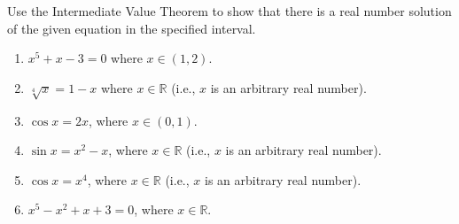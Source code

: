 Use the Intermediate Value Theorem to show that there is a real number solution of the given equation in the specified interval. 
\begin{multicols}{2}
\begin{enumerate}[ref={\fcProblemRef}]
\item $x^5+x-3=0$ where $x\in (1,2)$.
\item $\sqrt[4]{x}=1-x$ where $x\in \mathbb R$ (i.e., $x$ is an arbitrary real number).
\item $\cos x=2x$, where $x\in (0,1)$.
\item $\sin x=x^2-x$, where $x\in \mathbb R$ (i.e., $x$ is an arbitrary real number).
\item $\cos x=x^4$, where $x\in \mathbb R$ (i.e., $x$ is an arbitrary real number).
\item $x^5-x^2+x+3=0$, where $x\in \mathbb R$.
\end{enumerate}
\end{multicols}
